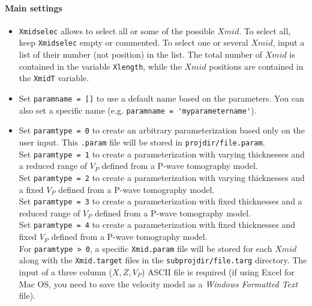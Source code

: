 \documentclass[twoside,a4paper]{article}
\begin{document}
\paragraph{Main settings}
\begin{itemize}[leftmargin=*]
\setlength\itemsep{2ex}
\item \verb|Xmidselec| allows to select all or some of the possible $Xmid$. To select all, keep \verb|Xmidselec| empty or commented. To select one or several $Xmid$, input a list of their number (not position) in the list. The total number of $Xmid$ is contained in the variable \verb|Xlength|, while the $Xmid$ positions are contained in the \verb|XmidT| variable.

\item Set \verb|paramname = []| to use a default name based on the parameters. You can also set a specific name (e.g. \verb|paramname = 'myparametername'|).

\item Set \verb|paramtype = 0| to create an arbitrary parameterization based only on the user input. This \verb|.param| file will be stored in \verb|projdir/file.param|.\\[1ex]
Set \verb|paramtype = 1| to create a parameterization with varying thicknesses and a reduced range of $V_P$ defined from a P-wave tomography model.\\[1ex]
Set \verb|paramtype = 2| to create a parameterization with varying thicknesses and a fixed $V_P$ defined from a P-wave tomography model.\\[1ex]
Set \verb|paramtype = 3| to create a parameterization with fixed thicknesses and a reduced range of $V_P$ defined from a P-wave tomography model.\\[1ex]
Set \verb|paramtype = 4| to create a parameterization with fixed thicknesses and fixed $V_P$ defined from a P-wave tomography model.\\[1ex]
For \verb|paramtype > 0|, a specific \verb|Xmid.param| file will be stored for each $Xmid$ along with the \verb|Xmid.target| files in the \verb|subprojdir/file.targ| directory. The input of a three column ($X,Z,V_P$) ASCII file is required (if using Excel for Mac OS, you need to save the velocity model as a \textit{Windows Formatted Text} file).
\end{itemize}
\end{document}
